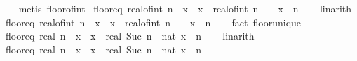 \begin{isabellebody}
%
\isadelimproof
\ \ %
\endisadelimproof
%
\isatagproof
{}\isamarkupfalse%
\ {\isacharparenleft}{\kern0pt}metis\ floor{\isacharunderscore}{\kern0pt}of{\isacharunderscore}{\kern0pt}int{\isacharparenright}{\kern0pt}%
\endisatagproof
{\isafoldproof}%
%
\isadelimproof
\isanewline
%
\endisadelimproof
\isanewline
{}\isamarkupfalse%
\ floor{\isacharunderscore}{\kern0pt}eq{\isacharcolon}{\kern0pt}\ {\isachardoublequoteopen}real{\isacharunderscore}{\kern0pt}of{\isacharunderscore}{\kern0pt}int\ n\ {\isacharless}{\kern0pt}\ x\ {\isasymLongrightarrow}\ x\ {\isacharless}{\kern0pt}\ real{\isacharunderscore}{\kern0pt}of{\isacharunderscore}{\kern0pt}int\ n\ {\isacharplus}{\kern0pt}\ {}\ {\isasymLongrightarrow}\ {\isasymlfloor}x{\isasymrfloor}\ {\isacharequal}{\kern0pt}\ n{\isachardoublequoteclose}\isanewline
%
\isadelimproof
\ \ %
\endisadelimproof
%
\isatagproof
{}\isamarkupfalse%
\ linarith%
\endisatagproof
{\isafoldproof}%
%
\isadelimproof
\isanewline
%
\endisadelimproof
\isanewline
{}\isamarkupfalse%
\ floor{\isacharunderscore}{\kern0pt}eq{}{\isacharcolon}{\kern0pt}\ {\isachardoublequoteopen}real{\isacharunderscore}{\kern0pt}of{\isacharunderscore}{\kern0pt}int\ n\ {\isasymle}\ x\ {\isasymLongrightarrow}\ x\ {\isacharless}{\kern0pt}\ real{\isacharunderscore}{\kern0pt}of{\isacharunderscore}{\kern0pt}int\ n\ {\isacharplus}{\kern0pt}\ {}\ {\isasymLongrightarrow}\ {\isasymlfloor}x{\isasymrfloor}\ {\isacharequal}{\kern0pt}\ n{\isachardoublequoteclose}\isanewline
%
\isadelimproof
\ \ %
\endisadelimproof
%
\isatagproof
{}\isamarkupfalse%
\ {\isacharparenleft}{\kern0pt}fact\ floor{\isacharunderscore}{\kern0pt}unique{\isacharparenright}{\kern0pt}%
\endisatagproof
{\isafoldproof}%
%
\isadelimproof
\isanewline
%
\endisadelimproof
\isanewline
{}\isamarkupfalse%
\ floor{\isacharunderscore}{\kern0pt}eq{}{\isacharcolon}{\kern0pt}\ {\isachardoublequoteopen}real\ n\ {\isacharless}{\kern0pt}\ x\ {\isasymLongrightarrow}\ x\ {\isacharless}{\kern0pt}\ real\ {\isacharparenleft}{\kern0pt}Suc\ n{\isacharparenright}{\kern0pt}\ {\isasymLongrightarrow}\ nat\ {\isasymlfloor}x{\isasymrfloor}\ {\isacharequal}{\kern0pt}\ n{\isachardoublequoteclose}\isanewline
%
\isadelimproof
\ \ %
\endisadelimproof
%
\isatagproof
{}\isamarkupfalse%
\ linarith%
\endisatagproof
{\isafoldproof}%
%
\isadelimproof
\isanewline
%
\endisadelimproof
\isanewline
{}\isamarkupfalse%
\ floor{\isacharunderscore}{\kern0pt}eq{}{\isacharcolon}{\kern0pt}\ {\isachardoublequoteopen}real\ n\ {\isasymle}\ x\ {\isasymLongrightarrow}\ x\ {\isacharless}{\kern0pt}\ real\ {\isacharparenleft}{\kern0pt}Suc\ n{\isacharparenright}{\kern0pt}\ {\isasymLongrightarrow}\ nat\ {\isasymlfloor}x{\isasymrfloor}\ {\isacharequal}{\kern0pt}\ n{\isachardoublequoteclose}\isanewline

\end{isabellebody}
